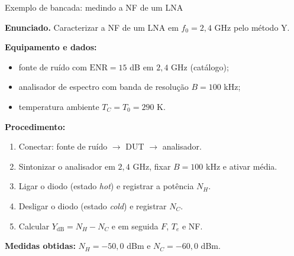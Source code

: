 
\begin{frame}{Exemplo de bancada: medindo a NF de um LNA}

\textbf{Enunciado.} Caracterizar a NF de um LNA em $f_0 = 2{,}4$ GHz pelo método Y.

\textbf{Equipamento e dados:}
\begin{itemize}
\item fonte de ruído com $\text{ENR} = 15$ dB em $2{,}4$ GHz (catálogo);
\item analisador de espectro com banda de resolução $B = 100$ kHz;
\item temperatura ambiente $T_C = T_0 = 290$ K.
\end{itemize}

\textbf{Procedimento:}
\begin{enumerate}
\item Conectar: fonte de ruído $\to$ DUT $\to$ analisador.
\item Sintonizar o analisador em $2{,}4$ GHz, fixar $B = 100$ kHz e ativar média.
\item Ligar o diodo (estado \emph{hot}) e registrar a potência $N_H$.
\item Desligar o diodo (estado \emph{cold}) e registrar $N_C$.
\item Calcular $Y_{\text{dB}} = N_H - N_C$ e em seguida $F$, $T_e$ e NF.
\end{enumerate}

\textbf{Medidas obtidas:} $N_H = -50{,}0$ dBm e $N_C = -60{,}0$ dBm.

\end{frame}


